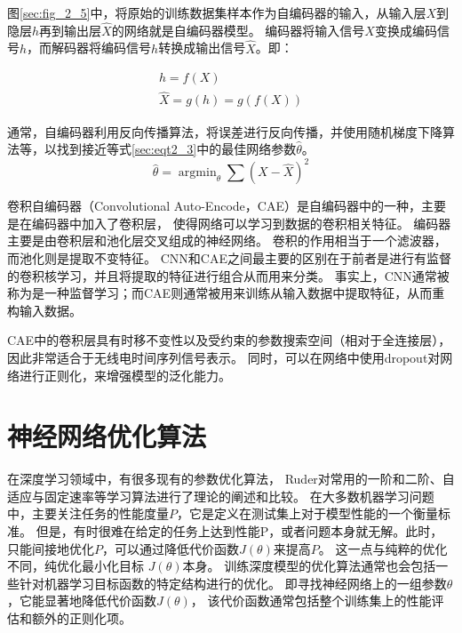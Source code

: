 图\ref{sec:fig_2_5}中，将原始的训练数据集样本作为自编码器的输入，从输入层$X$到隐层$h$再到输出层$\hat{X}$的网络就是自编码器模型。
编码器将输入信号$X$变换成编码信号$h$，而解码器将编码信号$h$转换成输出信号$\hat{X}$。即：\par

\begin{equation}
	\begin{gathered}
		h=f(X)
		\\
		\hat{X}=g(h)=g(f(X))
	\end{gathered}
\end{equation}

通常，自编码器利用反向传播算法，将误差进行反向传播，并使用随机梯度下降算法等，以找到接近等式\eqref{sec:eqt2_3}中的最佳网络参数$\hat{\theta}$。
\begin{equation}\label{sec:eqt2_3}
	\hat{\theta} = \mathop{\arg\min}_{\theta} \sum(X − \hat{X})^2
\end{equation}

卷积自编码器（Convolutional Auto-Encode，CAE）是自编码器中的一种，主要是在编码器中加入了卷积层，
使得网络可以学习到数据的卷积相关特征。
编码器主要是由卷积层和池化层交叉组成的神经网络。
卷积的作用相当于一个滤波器，而池化则是提取不变特征。
CNN和CAE之间最主要的区别在于前者是进行有监督的卷积核学习，并且将提取的特征进行组合从而用来分类。
事实上，CNN通常被称为是一种监督学习；而CAE则通常被用来训练从输入数据中提取特征，从而重构输入数据。\par

CAE中的卷积层具有时移不变性以及受约束的参数搜索空间（相对于全连接层），因此非常适合于无线电时间序列信号表示。
同时，可以在网络中使用dropout对网络进行正则化，来增强模型的泛化能力。\par

\section{神经网络优化算法}
在深度学习领域中，有很多现有的参数优化算法，
Ruder对常用的一阶和二阶、自适应与固定速率等学习算法进行了理论的阐述和比较\cite{ruder2016overview}。
在大多数机器学习问题中，主要关注任务的性能度量$P$，它是定义在测试集上对于模型性能的一个衡量标准。
但是，有时很难在给定的任务上达到性能P，或者问题本身就无解。此时，只能间接地优化$P$，可以通过降低代价函数$J(\theta)$来提高$P$。
这一点与纯粹的优化不同，纯优化最小化目标 $J(\theta)$本身。
训练深度模型的优化算法通常也会包括一些针对机器学习目标函数的特定结构进行的优化。
即寻找神经网络上的一组参数$\theta$，它能显著地降低代价函数$J(\theta)$，
该代价函数通常包括整个训练集上的性能评估和额外的正则化项。


